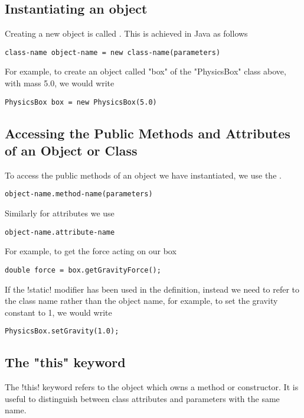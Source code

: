 \documentclass[11pt]{article}
\begin{document}
\subsection{Instantiating an object}
Creating a new object is called . This is achieved in Java as follows
\vspace{-30pt}
\begin{lstlisting}[style=basic]
class-name object-name = new class-name(parameters)
\end{lstlisting}
For example, to create an object called \inline"box" of the \inline"PhysicsBox" class above, with mass 5.0, we would write
\vspace{-15pt}
\begin{lstlisting}
PhysicsBox box = new PhysicsBox(5.0)
\end{lstlisting}

\subsection{Accessing the Public Methods and Attributes of an Object or Class}
To access the public methods of an object we have instantiated, we use the .
\vspace{-22pt}
\begin{lstlisting}[style=basic]
object-name.method-name(parameters)
\end{lstlisting}
Similarly for attributes we use
\vspace{-22pt}
\begin{lstlisting}[style=basic]
object-name.attribute-name
\end{lstlisting}
For example, to get the force acting on our box
\vspace{-15pt}
\begin{lstlisting}
double force = box.getGravityForce();
\end{lstlisting}
If the \inline!static! modifier has been used in the definition, instead we need to refer to the class name rather than the object name, for example, to set the gravity constant to 1, we would write
\vspace{-15pt}
\begin{lstlisting}
PhysicsBox.setGravity(1.0);
\end{lstlisting}
\subsection{The "this" keyword}
The  \inline!this! keyword refers to the object which owns a method or constructor. It is useful to distinguish between class attributes and parameters with the same name. 
\end{document}
